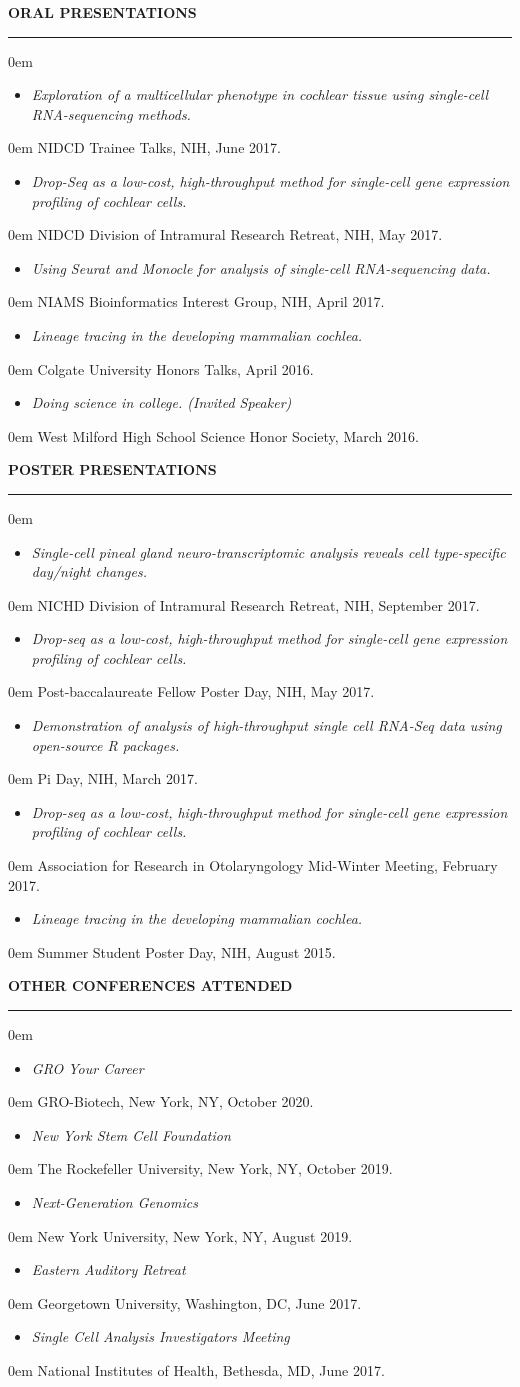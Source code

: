 \documentclass[11pt, letterpaper]{article}
\newenvironment{CVSection}{
\begin{addmargin}[2em]{0em}
\begin{samepage}}
{\end{samepage}
\end{addmargin}\bigskip}
\newcommand{\CVList}[2]{
\begin{samepage}
\begin{itemize}[leftmargin=*]
\item \textsl{#1}
\end{itemize}
\begin{addmargin}[2.5em]{0em}
#2
\end{addmargin}
\end{samepage}
}
\newcommand{\CVHeading}[1]{
\MakeUppercase{\bf #1}
\smallskip
\hrule
\medskip
}
\begin{document}
\CVHeading{Oral Presentations}
\begin{CVSection}
\CVList{Exploration of a multicellular phenotype in cochlear tissue using single-cell RNA-sequencing methods.}{NIDCD Trainee Talks, NIH, June 2017.}
\CVList{Drop-Seq as a low-cost, high-throughput method for single-cell gene expression profiling of cochlear cells.}{NIDCD Division of Intramural Research Retreat, NIH, May 2017.}
\CVList{Using Seurat and Monocle for analysis of single-cell RNA-sequencing data.}{NIAMS Bioinformatics Interest Group, NIH, April 2017.}
\CVList{Lineage tracing in the developing mammalian cochlea.}{Colgate University Honors Talks, April 2016.}
\CVList{Doing science in college. \textnormal{(Invited Speaker)}}{West Milford High School Science Honor Society, March 2016.}
\end{CVSection}

\CVHeading{Poster Presentations}
\begin{CVSection}
\CVList{Single-cell pineal gland neuro-transcriptomic analysis reveals cell type-specific day/night changes.}{NICHD Division of Intramural Research Retreat, NIH, September 2017.}
\CVList{Drop-seq as a low-cost, high-throughput method for single-cell gene expression profiling of cochlear cells.}{Post-baccalaureate Fellow Poster Day, NIH, May 2017.}
\CVList{Demonstration of analysis of high-throughput single cell RNA-Seq data using open-source R packages.}{Pi Day, NIH, March 2017.}
\CVList{Drop-seq as a low-cost, high-throughput method for single-cell gene expression profiling of cochlear cells.}{Association for Research in Otolaryngology Mid-Winter Meeting, February 2017.}
\CVList{Lineage tracing in the developing mammalian cochlea.}{Summer Student Poster Day, NIH, August 2015.}
\end{CVSection}

\CVHeading{Other Conferences Attended}
\begin{CVSection}
\CVList{GRO Your Career}{GRO-Biotech, New York, NY, October 2020.}
\CVList{New York Stem Cell Foundation}{The Rockefeller University, New York, NY, October 2019.}
\CVList{Next-Generation Genomics}{New York University, New York, NY, August 2019.}
\CVList{Eastern Auditory Retreat}{Georgetown University, Washington, DC, June 2017.}
\CVList{Single Cell Analysis Investigators Meeting}{National Institutes of Health, Bethesda, MD, June 2017.}
\end{CVSection}
\end{document}

